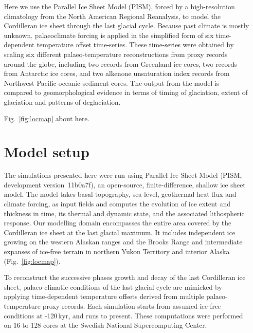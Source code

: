 \documentclass[tc, ms]{copernicus}
\begin{document}
Here we use the Parallel Ice Sheet Model (PISM), forced by a high-resolution
climatology from the North American Regional Reanalysis, to model the
Cordilleran ice sheet through the last glacial cycle. Because past climate
is mostly unknown, palaeoclimate forcing is applied in the simplified form of
six time-dependent temperature offset time-series. These time-series were
obtained by scaling six different palaeo-temperature reconstructions from
proxy records around the globe, including two  records from
Greenland ice cores, two  records from Antarctic ice cores,
and two alkenone unsaturation index records from Northwest Pacific oceanic
sediment cores. The output from the model is compared to geomorphological
evidence in terms of timing of glaciation, extent of glaciation and patterns
of deglaciation.


Fig.~\ref{fig:locmap} about here.

\section{Model setup}
\label{sec:model}

The simulations presented here were run using Parallel Ice Sheet Model (PISM,
development version~11b0a7f), an open-source, finite-difference, shallow ice
sheet model. The model takes basal topography, sea level, geothermal heat flux
and climate forcing, as input fields and computes the evolution of ice extent
and thickness in time, its thermal and dynamic state, and
the associated lithospheric response. Our modelling domain encompasses the
entire area covered by the Cordilleran ice sheet at the last glacial maximum.
It includes independent ice growing on the western Alaskan ranges and the
Brooks Range and intermediate expanses of ice-free terrain in northern Yukon
Territory and interior Alaska (Fig.~\ref{fig:locmap}).

To reconstruct the successive phases growth and decay of the last Cordilleran
ice sheet, palaeo-climatic conditions of the last glacial cycle are mimicked
by applying time-dependent temperature offsets derived from multiple
palaeo-temperature proxy records. Each simulation starts from assumed ice-free
conditions at -120\,kyr, and runs to present. These computations were
performed on 16 to 128 cores at the Swedish National Supercomputing
Center.
\end{document}
